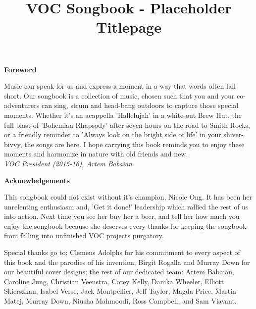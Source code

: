 \documentclass{article}
\begin{document}
\title{VOC Songbook - Placeholder Titlepage}
\begin{titlepage}
\maketitle
\thispagestyle{empty}
\end{titlepage}

\newpage

\textbf{Foreword}

\vspace{4mm}

Music can speak for us and express a moment in a way that words often fall
short. Our songbook is a collection of music, chosen such that you and your
co-adventurers can sing, strum and head-bang outdoors to capture those special
moments. Whether it's an acappella 'Hallelujah' in a white-out Brew Hut, the
full blast of 'Bohemian Rhapsody' after seven hours on the road to Smith Rocks,
or a friendly reminder to 'Always look on the bright side of life' in your
shiver-bivvy, the songs are here. I hope carrying this book reminds you to
enjoy these moments and harmonize in nature with old friends and new.
\\[\medskipamount]

\textit{VOC President (2015-16), Artem Babaian}

\vspace{10mm}

\textbf{Acknowledgements}

\vspace{4mm}

This songbook could not exist without it's champion, Nicole Ong. It has been
her unrelenting enthusiasm and, 'Get it done!' leadership which rallied the
rest of us into action. Next time you see her buy her a beer, and tell her how
much you enjoy the songbook because she deserves every thanks for keeping the
songbook from falling into unfinished VOC projects purgatory.
\vspace{4mm}

Special thanks go to; Clemens Adolphs for his commitment to every aspect of
this book and the parodies of his invention; Birgit Rogalla and Murray Down for
our beautiful cover designs; the rest of our dedicated team: Artem Babaian,
Caroline Jung, Christian Veenstra, Corey Kelly, Danika Wheeler, Elliott
Skierszkan, Isabel Verse, Jack Montpellier, Jeff Taylor, Magda Price, Martin
Matej, Murray Down, Niusha Mahmoodi, Ross Campbell, and Sam Viavant.
\end{document}
